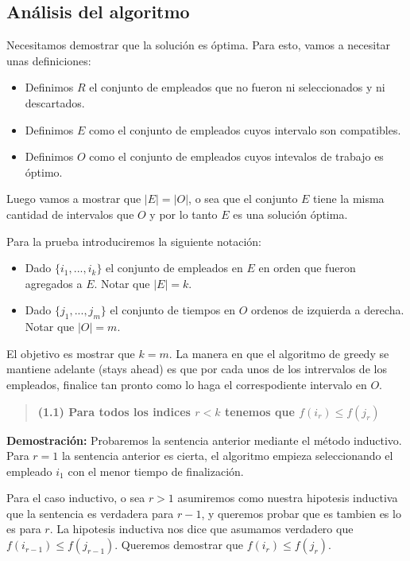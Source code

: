 \documentclass{article}
\begin{document}
\subsection{Análisis del algoritmo}

Necesitamos demostrar que la solución es óptima. Para esto, vamos a necesitar unas definiciones:
\begin{itemize}
    \item Definimos \(R\) el conjunto de empleados que no fueron ni seleccionados y ni descartados.
    \item Definimos \(E\) como el conjunto de empleados cuyos intervalo son compatibles.
    \item Definimos \(O\) como el conjunto de empleados cuyos intevalos de trabajo es óptimo.
\end{itemize}
Luego vamos a mostrar que \(|E| = |O|\), o sea que el conjunto \(E\) tiene la misma cantidad de intervalos que \(O\) y 
por lo tanto \(E\) es una solución óptima.

Para la prueba introduciremos la siguiente notación:
\begin{itemize}
    \item Dado \(\{i_1,...,i_k\}\) el conjunto de empleados en \(E\) en orden que fueron agregados a \(E\). Notar que \(|E|=k\).
    \item Dado \(\{j_1,...,j_m\}\) el conjunto de tiempos en \(O\) ordenos de izquierda a derecha. Notar que \(|O|=m\).
\end{itemize}

El objetivo es mostrar que \(k=m\). 
La manera en que el algoritmo de greedy se mantiene adelante (stays ahead) es que por cada unos de los intrervalos de los empleados, 
finalice tan pronto como lo haga el correspodiente intervalo en \(O\).

\begin{quote}
    \textbf{(1.1) Para todos los indices \(r<k\) tenemos que \(f(i_r) \leq f(j_r)\)}
\end{quote}

\textbf{Demostración:}  Probaremos la sentencia anterior mediante el método inductivo. 
Para \(r=1\) la sentencia anterior es cierta, el algoritmo empieza seleccionando el empleado \(i_1\) con el menor tiempo de finalización.

Para el caso inductivo, o sea \(r>1\) asumiremos como nuestra hipotesis inductiva que la sentencia es verdadera para \(r-1\), y queremos probar que es tambien es lo es para \(r\). 
La hipotesis inductiva nos dice que asumamos verdadero que \(f(i_{r-1}) \leq f(j_{r-1})\). Queremos demostrar que \(f(i_{r}) \leq f(j_{r})\).
\end{document}
